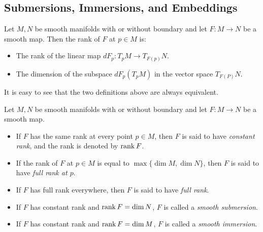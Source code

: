 \subsection{Submersions, Immersions, and Embeddings}

\begin{defn}[Rank]
  Let $M, N$ be smooth manifolds with or without boundary and let $F: M \rightarrow N$ be a smooth map.
  Then the rank of $F$ at $p \in M$ is:
  \begin{itemize}
    \item
      The rank of the linear map $dF_p: T_pM \rightarrow T_{F(p)}N$.
    \item
      The dimension of the subspace $dF_p(T_pM)$ in the vector space $T_{F(P)}N$.
  \end{itemize}
  It is easy to see that the two definitions above are always equivalent.
\end{defn}

\begin{defn}
  Let $M, N$ be smooth manifolds with or without boundary and let $F: M \rightarrow N$ be a smooth map.
  \begin{itemize}
    \item
      If $F$ has the same rank at every point $p \in M$, then $F$ is said to have \textit{constant rank}, and the rank is denoted by $\rank F$.
    \item
      If the rank of $F$ at $p \in M$ is equal to $\max \{ \dim M, \dim N \}$, then $F$ is said to have \textit{full rank at $p$}.
    \item
      If $F$ has full rank everywhere, then $F$ is said to have \textit{full rank}.
    \item
      If $F$ has constant rank and $\rank F = \dim N$, $F$ is called a \textit{smooth submersion}.
    \item
      If $F$ has constant rank and $\rank F = \dim M$, $F$ is called a \textit{smooth immersion}.
  \end{itemize}
\end{defn}

